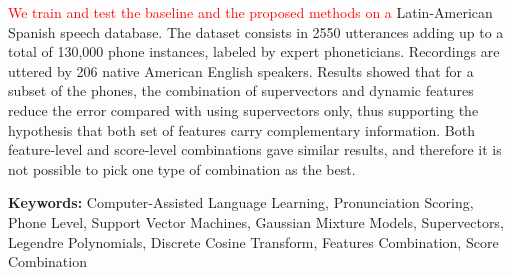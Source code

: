 \textcolor{red}{We train and test the baseline and the proposed methods on a}
Latin-American Spanish speech database.
The dataset consists in 2550 utterances adding up to a total of
130,000 phone instances, labeled
by expert phoneticians. Recordings are uttered by 206 native American English speakers.
Results showed that for a subset of the phones, the combination of supervectors and
dynamic features reduce the error compared with using supervectors only, thus supporting
the hypothesis that both set of features carry complementary information. Both feature-level
and score-level combinations gave similar results, and therefore it is not possible
to pick one type of combination as the best.

\bigskip

\noindent\textbf{Keywords:} Computer-Assisted Language Learning, Pronunciation Scoring, Phone Level, Support Vector Machines, Gaussian Mixture Models, Supervectors, Legendre Polynomials, Discrete Cosine Transform, Features Combination, Score Combination


